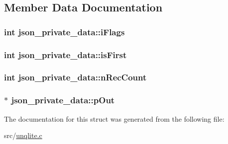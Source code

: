 \subsection{Member Data Documentation}
\hypertarget{structjson__private__data_a8dbc4f764b916c1519c72a119da212e8}{
\subsubsection[{i\-Flags}]{\setlength{\rightskip}{0pt plus 5cm}int json\-\_\-private\-\_\-data\-::i\-Flags}}\label{d0/d9b/structjson__private__data_a8dbc4f764b916c1519c72a119da212e8}
\hypertarget{structjson__private__data_a23df689575317d0c3489cc16a909199b}{
\subsubsection[{is\-First}]{\setlength{\rightskip}{0pt plus 5cm}int json\-\_\-private\-\_\-data\-::is\-First}}\label{d0/d9b/structjson__private__data_a23df689575317d0c3489cc16a909199b}
\hypertarget{structjson__private__data_a4216dc3c7d91aff453a6081fa11876a3}{
\subsubsection[{n\-Rec\-Count}]{\setlength{\rightskip}{0pt plus 5cm}int json\-\_\-private\-\_\-data\-::n\-Rec\-Count}}\label{d0/d9b/structjson__private__data_a4216dc3c7d91aff453a6081fa11876a3}
\hypertarget{structjson__private__data_ae61243ee18a6b856f1e057c3a8ba7b2d}{
\subsubsection[{p\-Out}]{$\ast$ json\-\_\-private\-\_\-data\-::p\-Out}}\label{d0/d9b/structjson__private__data_ae61243ee18a6b856f1e057c3a8ba7b2d}


The documentation for this struct was generated from the following file\-:\begin{DoxyCompactItemize}
\item 
src/\hyperlink{unqlite_8c}{unqlite.\-c}\end{DoxyCompactItemize}
